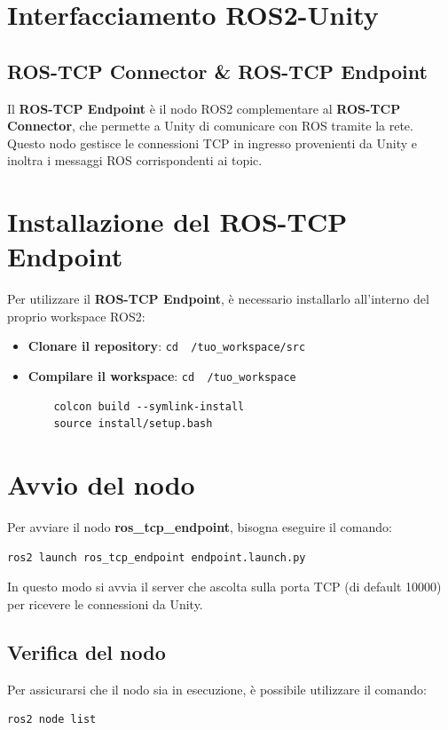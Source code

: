 \documentclass[11pt]{report}
\begin{document}
\section{Interfacciamento ROS2-Unity}

\subsection{ROS-TCP Connector \& ROS-TCP Endpoint}
Il \textbf{ROS-TCP Endpoint} è il nodo ROS2 complementare al \textbf{ROS-TCP Connector}, che permette a Unity di comunicare con ROS tramite la rete. Questo nodo gestisce le connessioni TCP in ingresso provenienti da Unity e inoltra i messaggi ROS corrispondenti ai topic.

\section*{\textbf{Installazione del ROS-TCP Endpoint}}
Per utilizzare il \textbf{ROS-TCP Endpoint}, è necessario installarlo all'interno del proprio workspace ROS2:

\begin{itemize}
    \item \textbf{Clonare il repository}: \texttt{cd ~/tuo\_workspace/src}
    \item \textbf{Compilare il workspace}: \texttt{cd ~/tuo\_workspace}
    \begin{verbatim}
    colcon build --symlink-install
    source install/setup.bash
    \end{verbatim}
\end{itemize}

\section*{\textbf{Avvio del nodo}}

Per avviare il nodo \textbf{ros\_tcp\_endpoint}, bisogna eseguire il comando:

\begin{verbatim}
ros2 launch ros_tcp_endpoint endpoint.launch.py
\end{verbatim}

In questo modo si avvia il server che ascolta sulla porta TCP (di default 10000) per ricevere le connessioni da Unity.

\subsection*{\textbf{Verifica del nodo}}
Per assicurarsi che il nodo sia in esecuzione, è possibile utilizzare il comando: \begin{verbatim}
ros2 node list
\end{verbatim}
\end{document}

